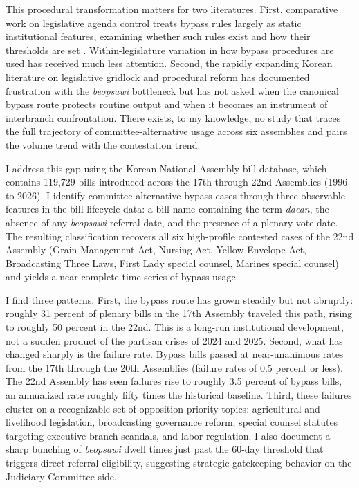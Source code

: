 \documentclass[11pt]{article}
\begin{document}
This procedural transformation matters for two literatures. First, comparative work on legislative agenda control treats bypass rules largely as static institutional features, examining whether such rules exist and how their thresholds are set \citep{coxmccubbins2005, crosson2018, chafetz2019}. Within-legislature variation in how bypass procedures are used has received much less attention. Second, the rapidly expanding Korean literature on legislative gridlock and procedural reform has documented frustration with the \textit{beopsawi} bottleneck \citep{kimlee2026, parkpy2026, jang2021} but has not asked when the canonical bypass route protects routine output and when it becomes an instrument of interbranch confrontation. There exists, to my knowledge, no study that traces the full trajectory of committee-alternative usage across six assemblies and pairs the volume trend with the contestation trend.

I address this gap using the Korean National Assembly bill database, which contains 119{,}729 bills introduced across the 17th through 22nd Assemblies (1996 to 2026). I identify committee-alternative bypass cases through three observable features in the bill-lifecycle data: a bill name containing the term \textit{daean}, the absence of any \textit{beopsawi} referral date, and the presence of a plenary vote date. The resulting classification recovers all six high-profile contested cases of the 22nd Assembly (Grain Management Act, Nursing Act, Yellow Envelope Act, Broadcasting Three Laws, First Lady special counsel, Marines special counsel) and yields a near-complete time series of bypass usage.

I find three patterns. First, the bypass route has grown steadily but not abruptly: roughly 31 percent of plenary bills in the 17th Assembly traveled this path, rising to roughly 50 percent in the 22nd. This is a long-run institutional development, not a sudden product of the partisan crises of 2024 and 2025. Second, what has changed sharply is the failure rate. Bypass bills passed at near-unanimous rates from the 17th through the 20th Assemblies (failure rates of 0.5 percent or less). The 22nd Assembly has seen failures rise to roughly 3.5 percent of bypass bills, an annualized rate roughly fifty times the historical baseline. Third, these failures cluster on a recognizable set of opposition-priority topics: agricultural and livelihood legislation, broadcasting governance reform, special counsel statutes targeting executive-branch scandals, and labor regulation. I also document a sharp bunching of \textit{beopsawi} dwell times just past the 60-day threshold that triggers direct-referral eligibility, suggesting strategic gatekeeping behavior on the Judiciary Committee side.
\end{document}
